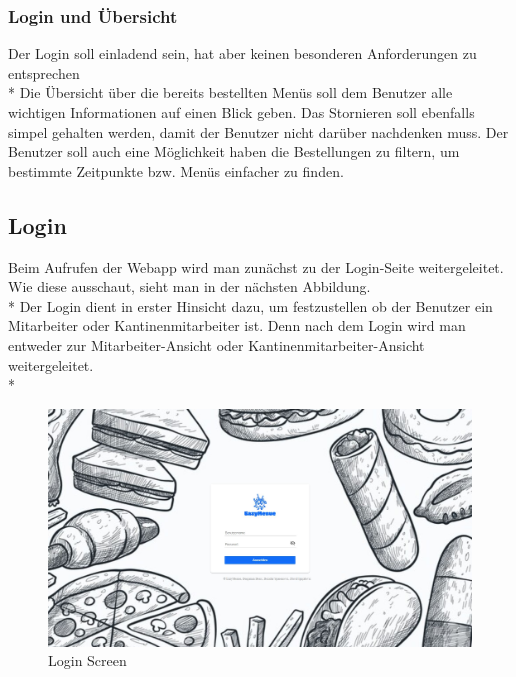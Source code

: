 \subsubsection{Login und Übersicht}
Der Login soll einladend sein, hat aber keinen besonderen Anforderungen zu entsprechen \\*
Die Übersicht über die bereits bestellten Menüs soll dem Benutzer alle wichtigen Informationen auf einen Blick geben.
Das Stornieren soll ebenfalls simpel gehalten werden, damit der Benutzer nicht darüber nachdenken muss.
Der Benutzer soll auch eine Möglichkeit haben die Bestellungen zu filtern, um bestimmte Zeitpunkte bzw. Menüs einfacher zu finden.


\subsection{Login}
Beim Aufrufen der Webapp wird man zunächst zu der Login-Seite weitergeleitet. Wie diese ausschaut, sieht man in der nächsten Abbildung. \\*
Der Login dient in erster Hinsicht dazu, um festzustellen ob der Benutzer ein Mitarbeiter oder Kantinenmitarbeiter ist.
Denn nach dem Login wird man entweder zur Mitarbeiter-Ansicht oder Kantinenmitarbeiter-Ansicht weitergeleitet. \\*

\begin{figure}[htp]
    \centering
    \includegraphics[scale=0.3]{pics/login_screen_vue.JPG}
    \caption{Login Screen}
    \label{fig:impl:LoginVue}
\end{figure}


\pagebreak

